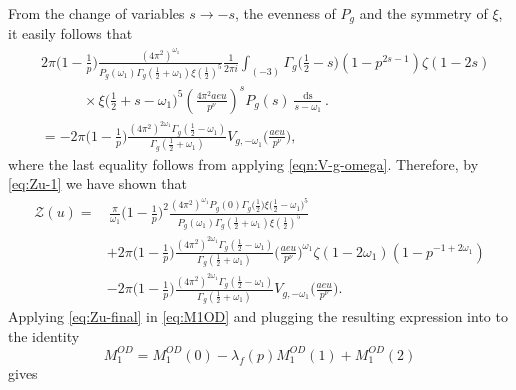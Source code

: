 \documentclass[12pt]{amsart}
\theoremstyle{plain}
\theoremstyle{definition}
\begin{document}
 From the change of variables $s\to -s$, the evenness of $P_g$ and the symmetry of $\xi$, it easily follows that
    \begin{align*}
    &2\pi   \Big(1-\frac{1}{p}\Big)
    \frac{(4\pi^2)^{\omega_1}}{P_g(\omega_1) \Gamma_g(\frac12+\omega_1) \xi(\frac12)^5} 
     \frac{1}{2\pi i}  \int_{(-3)} 
    \Gamma_g\Big(\frac12-s\Big)
     (1-p^{2s-1}) \zeta(1-2s)       \\
    &\hspace{3em} \times 
    \xi\Big(\frac12+s-\omega_1\Big)^5
   \left(\frac{4\pi^2aeu}{p^\nu}\right)^{s} 
  P_g(s)  
   \frac{\mathop{ds}}{s-\omega_1}  .   \\&   
    =-2\pi    \Big(1-\frac1{p}\Big)
    \frac{(4\pi^2)^{2\omega_1} \Gamma_g(\frac12-\omega_1)}{ \Gamma_g(\frac12+\omega_1) } 
    V_{g, -\omega_1}\Big(\frac{aeu}{p^\nu}\Big) ,
    \end{align*} where the last equality follows from applying \eqref{eqn:V-g-omega}. 
Therefore, by \eqref{eq:Zu-1} we have shown that
    \begin{equation}\label{eq:Zu-final}
    \begin{split}
    \mathcal{Z}(u)
    = &\, \frac{\pi}{\omega_1}    \Big(1-\frac{1}{p}\Big)^2
    \frac{(4\pi^2)^{\omega_1}P_g(0) \Gamma_g\big(\frac12\big)  \xi\big(\frac12-\omega_1\big)^5}{P_g(\omega_1) \Gamma_g(\frac12+\omega_1) \xi(\frac12)^5}  
     \\
    & + 2\pi   \Big(1-\frac{1}{p}\Big)
    \frac{(4\pi^2)^{2\omega_1}\Gamma_g(\frac12-\omega_1)}{\Gamma_g(\frac12+\omega_1) } 
     \Big(\frac{ ae  u}{p^\nu}\Big)^{\omega_1} 
    \zeta(1-2\omega_1)  (1-p^{-1+2\omega_1})
    \\
    &-2\pi    \Big(1-\frac1{p}\Big)
    \frac{(4\pi^2)^{2\omega_1} \Gamma_g(\frac12-\omega_1)}{ \Gamma_g(\frac12+\omega_1) } 
    V_{g, -\omega_1}\Big(\frac{aeu}{p^\nu}\Big) .
    \end{split}
    \end{equation}
 Applying \eqref{eq:Zu-final} in \eqref{eq:M1OD}  and plugging the resulting expression into to the identity \[M^{OD}_1=M^{OD}_1(0)-\lambda_f(p)M_{1}^{OD}(1)+M_{1}^{OD}(2)\] gives
\end{document}

